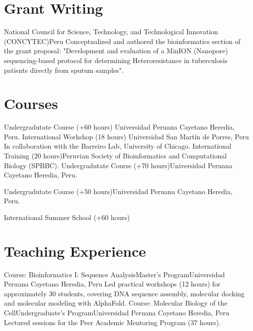 \documentclass[11pt,a4paper,sans]{moderncv}
\begin{document}
\section{Grant Writing}
  {National Council for Science, Technology, and Technological Innovation (CONCYTEC)}{Peru}
  {}
  {Conceptualized and authored the bioinformatics section of the grant proposal: "Development and evaluation of a MinION (Nanopore) sequencing-based protocol for determining
Heteroresistance in tuberculosis patients directly from sputum samples".
}

\section{Courses}
  {Undergradutate Course (+60 hours)}
  {Universidad Peruana Cayetano Heredia, Peru.}
  {}
  {}
  {International Workshop (18 hours)}
  {Universidad San Martín de Porres, Peru}
  {In collaboration with the Barreiro Lab, University of Chicago.}
  {}
  {International Training (20 hours)}{Peruvian Society of Bioinformatics and Computational Biology (SPBBC).}{}
  {}  
  {Undergradutate Course (+70 hours)}{Universidad Peruana Cayetano Heredia, Peru.}{}
  {}

  {Undergradutate Course (+50 hours)}{Universidad Peruana Cayetano Heredia, Peru.}{}
  {}

  {International Summer School (+60 hours)}{}{}
  {}

\section{Teaching Experience}
    {Course: Bioinformatics I: Sequence Analysis}{Master’s Program}{Universidad Peruana Cayetano Heredia, Peru}
    {Led practical workshops (12 hours) for approximately 30 students, covering DNA sequence assembly, molecular docking and molecular modeling with AlphaFold.
    }
    {Course: Molecular Biology of the Cell}{Undergraduate’s Program}{Universidad Peruana Cayetano Heredia, Peru}
    {Lectured sessions for the Peer Academic Mentoring Program (37 hours). 
    }
\end{document}
